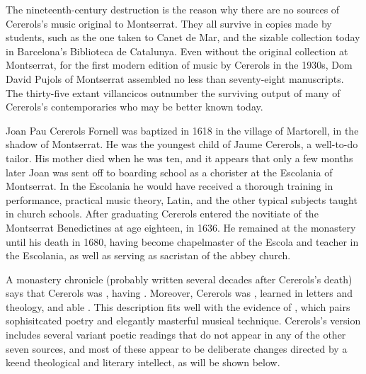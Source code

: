 The nineteenth-century destruction is the reason why there are no sources of
Cererols's music original to Montserrat.
They all survive in copies made by students, such as the one taken to Canet de
Mar, and the sizable collection today in Barcelona's Biblioteca de Catalunya.
Even without the original collection at Montserrat, for the first modern edition
of music by Cererols in the 1930s, Dom David Pujols of Montserrat assembled no
less than seventy-eight manuscripts.
The thirty-five extant villancicos outnumber the surviving output of many of
Cererols's contemporaries who may be better known today.\XXX[who?]

Joan Pau Cererols Fornell was baptized in 1618 in the village of Martorell, in
the shadow of Montserrat.%
    \Autocite{Balanza:CererolsFamily}
He was the youngest child of Jaume Cererols, a well-to-do tailor.
His mother died when he was ten, and it appears that only a few months later
Joan was sent off to boarding school as a chorister at the Escolania of
Montserrat.%
    \Autocite{Balanza:CererolsFamily}
In the Escolania he would have received a thorough training in performance,
practical music theory, Latin, and the other typical subjects taught in church
schools.
After graduating Cererols entered the novitiate of the Montserrat Benedictines
at age eighteen, in 1636.
He remained at the monastery until his death in 1680, having become chapelmaster
of the Escola and teacher in the Escolania, as well as serving as sacristan of
the abbey church.

A monastery chronicle (probably written several decades after Cererols's death)
says that Cererols was , having .
Moreover, Cererols was , learned in letters and
theology, and able .%
    \Autocite
    [{\XXX[original]}]
    [7, note 2]
    {Estrada:CererolsBio}
This description fits well with the evidence of ,
which pairs sophisitcated poetry and elegantly masterful musical technique.
Cererols's version includes several variant poetic readings that do not appear
in any of the other seven sources, and most of these appear to be deliberate
changes directed by a keend theological and literary intellect, as will be shown
below.

